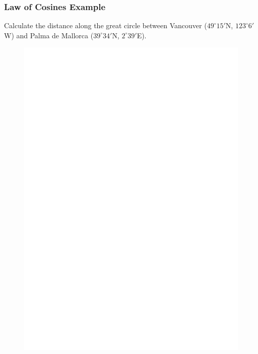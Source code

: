 \documentclass[xcolor=dvipsnames]{beamer}
\begin{document}
\begin{frame}
  \frametitle{Law of Cosines Example}
Calculate the distance along the great circle between Vancouver
($49^{\circ}15'$N, $123^{\circ}6'$W) and Palma de Mallorca
($39^{\circ}34'$N, $2^{\circ}39'$E).
\begin{figure}[h]
\includegraphics[scale=.4]{./VancouverPalma1.eps}
\end{figure}
\end{frame}
\end{document}
